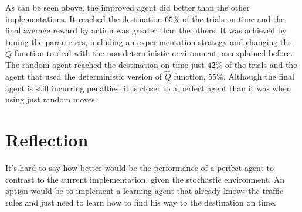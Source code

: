 \documentclass[a4paper]{article}
\begin{document}
As can be seen above, the improved agent did better than the other implementations. It reached the destination $65\%$ of the trials on time and the final average reward by action was greater than the others. It was achieved by tuning the parameters, including an experimentation strategy and changing the $\hat{Q}$ function to deal with the non-deterministic environment, as explained before. The random agent reached the destination on time just $42\%$ of the trials and the agent that used the deterministic version of $\hat{Q}$ function, $55\%$. Although the final agent is still incurring penalties, it is closer to a perfect agent than it was when using just random moves.


\section{Reflection}
\label{sec:reflection}
It's hard to say how better would be the performance of a perfect agent to contrast to the current implementation, given the stochastic environment. An option would be to implement a learning agent that already knows the traffic rules and just need to learn how to find his way to the destination on time.






\end{document}
